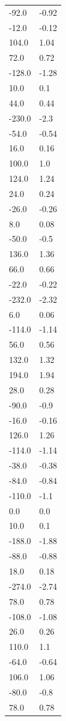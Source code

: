\begin{longtable}{ll}
-92.0 & -0.92 \\
-12.0 & -0.12 \\
104.0 & 1.04 \\
72.0 & 0.72 \\
-128.0 & -1.28 \\
10.0 & 0.1 \\
44.0 & 0.44 \\
-230.0 & -2.3 \\
-54.0 & -0.54 \\
16.0 & 0.16 \\
100.0 & 1.0 \\
124.0 & 1.24 \\
24.0 & 0.24 \\
-26.0 & -0.26 \\
8.0 & 0.08 \\
-50.0 & -0.5 \\
136.0 & 1.36 \\
66.0 & 0.66 \\
-22.0 & -0.22 \\
-232.0 & -2.32 \\
6.0 & 0.06 \\
-114.0 & -1.14 \\
56.0 & 0.56 \\
132.0 & 1.32 \\
194.0 & 1.94 \\
28.0 & 0.28 \\
-90.0 & -0.9 \\
-16.0 & -0.16 \\
126.0 & 1.26 \\
-114.0 & -1.14 \\
-38.0 & -0.38 \\
-84.0 & -0.84 \\
-110.0 & -1.1 \\
0.0 & 0.0 \\
10.0 & 0.1 \\
-188.0 & -1.88 \\
-88.0 & -0.88 \\
18.0 & 0.18 \\
-274.0 & -2.74 \\
78.0 & 0.78 \\
-108.0 & -1.08 \\
26.0 & 0.26 \\
110.0 & 1.1 \\
-64.0 & -0.64 \\
106.0 & 1.06 \\
-80.0 & -0.8 \\
78.0 & 0.78 \\

\end{longtable}

